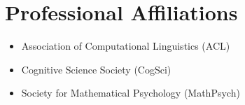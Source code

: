 \documentclass[11pt]{article}
\begin{document}
\section*{Professional Affiliations}
\begin{itemize}
    \item Association of Computational Linguistics (ACL)
    \item Cognitive Science Society (CogSci)
    \item Society for Mathematical Psychology (MathPsych)
\end{itemize}




\end{document}
